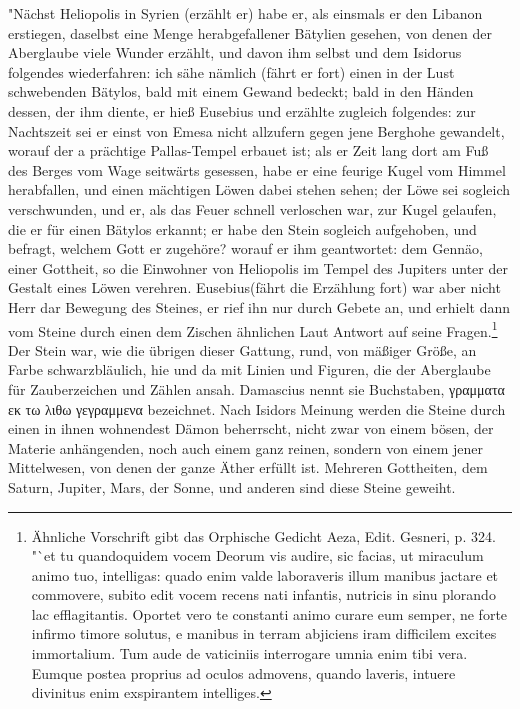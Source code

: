\documentclass[a4paper, 11pt, oneside, polutonikogreek, german]{article}
\begin{document}
"Nächst Heliopolis in Syrien (erzählt er) habe er, als einsmals er den Libanon erstiegen, daselbst eine Menge herabgefallener Bätylien gesehen, von denen der Aberglaube viele Wunder erzählt, und davon ihm selbst und dem Isidorus folgendes wiederfahren: ich sähe nämlich (fährt er fort) einen in der Lust schwebenden Bätylos, bald mit einem Gewand bedeckt; bald in den Händen dessen, der ihm diente, er hieß Eusebius und erzählte zugleich folgendes: zur Nachtszeit sei er einst von Emesa nicht allzufern gegen jene Berghohe gewandelt, worauf der a prächtige Pallas-Tempel erbauet ist; als er Zeit lang dort am Fuß des Berges vom Wage seitwärts gesessen, habe er eine feurige Kugel vom Himmel herabfallen, und einen mächtigen Löwen dabei stehen sehen; der Löwe sei sogleich verschwunden, und er, als das Feuer schnell verloschen war, zur Kugel gelaufen, die er für einen Bätylos erkannt; er habe den Stein sogleich aufgehoben, und befragt, welchem Gott er zugehöre? worauf er ihm geantwortet: dem Gennäo, einer Gottheit, so die Einwohner von Heliopolis im Tempel des Jupiters unter der Gestalt eines Löwen verehren. Eusebius(fährt die Erzählung fort) war aber nicht Herr dar Bewegung des Steines, er rief ihn nur durch Gebete an, und erhielt dann vom Steine durch einen dem Zischen ähnlichen Laut Antwort auf seine Fragen.\footnote{Ähnliche Vorschrift gibt das Orphische Gedicht Aeza, Edit. Gesneri, p. 324. "`et tu quandoquidem vocem Deorum vis audire, sic facias, ut miraculum animo tuo, intelligas: quado enim valde laboraveris illum manibus jactare et commovere, subito edit vocem recens nati infantis, nutricis in sinu plorando lac efflagitantis. Oportet vero te constanti animo curare eum semper, ne forte infirmo timore solutus, e manibus in terram abjiciens iram difficilem excites immortalium. Tum aude de vaticiniis interrogare umnia enim tibi vera. Eumque postea proprius ad oculos admovens, quando laveris, intuere divinitus enim exspirantem intelliges.} Der Stein war, wie die übrigen dieser Gattung, rund, von mäßiger Größe, an Farbe schwarzbläulich, hie und da mit Linien und Figuren, die der Aberglaube für Zauberzeichen und Zählen ansah. Damascius nennt sie Buchstaben, γραμματα εκ τω λιθω γεγραμμενα bezeichnet. Nach Isidors Meinung werden die Steine durch einen in ihnen wohnendest Dämon beherrscht, nicht zwar von einem bösen, der Materie anhängenden, noch auch einem ganz reinen, sondern von einem jener Mittelwesen, von denen der ganze Äther erfüllt ist. Mehreren Gottheiten, dem Saturn, Jupiter, Mars, der Sonne, und anderen sind diese Steine geweiht.
\end{document}
